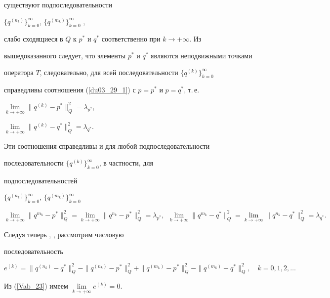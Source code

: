\begin{pf}
существуют подпоследовательности 


$\{{q^{(n_k)}} \}^\infty_{k=0}$, $ \{{q^{(m_k)}} \}^\infty_{k=0}$ , 


слабо сходящиеся в $Q$ к $p^*$ и ${q^*}$ соответственно при ${k \to+\infty}$. Из 


вышедоказанного следует, что элементы $p^*$ и ${q^*}$ являются неподвижными точками


оператора $T$, следовательно, для всей последовательности $ \{{q^{(k)}} \}^\infty_{k=0}$ 


справедливы соотношения (\ref{du03_29_1}) с ${p=p^*}$ и ${p={q^*}}$, т.\,е.


$\lim\limits_{k \to+\infty} \|q^{(k)}-p^*\|^2_Q=\lambda_{p^*}$, 


$\lim\limits_{k \to+\infty}\|q^{(k)}-{q^*}\|^2_Q=\lambda_{q^*}$.





Эти соотношения справедливы и для любой подпоследовательности


последовательности $ \{{q^{(k)}} \}^\infty_{k=0}$, в частности, для 


подпоследовательностей 


$ \{{q^{(n_k)}} \}^\infty_{k=0}$, $ \{{q^{(m_k)}} \}^\infty_{k=0}$


\begin{equation}


\lim\limits_{k \to+\infty}\|q^{m_k}{-}{p^*} \|^2_Q= 


\lim\limits_{k \to+\infty}\|q^{n_k}{-}{p^*} \|^2_Q=\lambda_{p^*},\ \


\lim\limits_{k \to+\infty}\|q^{m_k}{-} {q^*} \|^2_Q=


\lim\limits_{k \to+\infty}\|q^{n_k}{-}{q^*} \|^2_Q=\lambda_{q^*}.


\label{Vab_23}


\end{equation}





Следуя теперь \cite{Mrs_77}, \cite{Opl_67}, рассмотрим числовую 


последовательность


$$


e^{(k)}= \|q^{(n_k)}-{q^*}\|_Q^2-\|q^{(n_k)}-{p^*}\|_Q^2+\|q^{(m_k)}-{p^*}\|_Q^2-\|q^{(m_k)}-{q^*}\|_Q^2, 


\quad k=0,1,2,\dotsc


$$ 


Из (\ref{Vab_23}) имеем $\lim\limits_{k\to+\infty}e^{(k)}=0$.



\end{pf}
